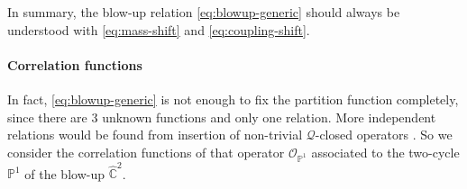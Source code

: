 \documentclass[letterpaper, 11pt]{article}
\def\IP{\mathbb{P}}
\begin{document}
In summary, the blow-up  relation \eqref{eq:blowup-generic} should always be understood with \eqref{eq:mass-shift} and \eqref{eq:coupling-shift}.



\paragraph{Correlation functions}

In fact, \eqref{eq:blowup-generic} is not enough to fix the partition function completely,  since there are 3 unknown functions and only one relation. More independent relations would be found from insertion of non-trivial $\mathcal{Q}$-closed operators \cite{Nakajima:2003pg,Nakajima:2005fg}. So we consider the correlation functions of that operator $\mathcal{O}_{\IP^1}$ associated to the two-cycle $\IP^1$ of the blow-up $\hat{\mathbb{C}}^2$. 
\end{document}
